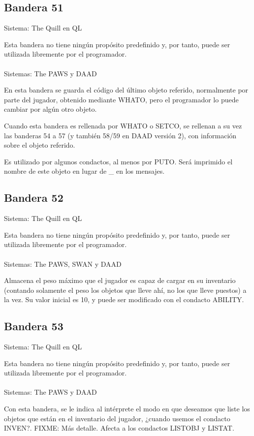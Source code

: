 \documentclass[11pt, a5paper]{article}
\newcommand{\quill}{\textsf{The Quill}\xspace}
\newcommand{\paw}{\textsf{The PAWS}\xspace}
\newcommand{\swan}{\textsf{SWAN}\xspace}
\newcommand{\daad}{\textsf{DAAD}\xspace}
\newcommand{\sistema}[1]{\noindent Sistema: #1 \nopagebreak}
\newcommand{\sistemas}[1]{\noindent Sistemas: #1 \nopagebreak}
\begin{document}
\subsection{Bandera 51}

\sistema{\quill en QL}

Esta bandera no tiene ningún propósito predefinido y, por tanto, puede ser utilizada libremente por el programador.
\\\ \\
\sistemas{\paw y \daad}

En esta bandera se guarda el código del último objeto referido, normalmente por parte del jugador, obtenido mediante WHATO, pero el programador lo puede cambiar por algún otro objeto.

Cuando esta bandera es rellenada por WHATO o SETCO, se rellenan a su vez las banderas 54 a 57 (y también 58/59 en \daad versión 2), con información sobre el objeto referido.

Es utilizado por algunos condactos, al menos por PUTO. Será imprimido el nombre de este objeto en lugar de \_ en los mensajes.

\subsection{Bandera 52}

\sistema{\quill en QL}

Esta bandera no tiene ningún propósito predefinido y, por tanto, puede ser utilizada libremente por el programador.
\\\ \\
\sistemas{\paw, \swan y \daad}

Almacena el peso máximo que el jugador es capaz de cargar en su inventario (contando solamente el peso los objetos que lleve ahí, no los que lleve puestos) a la vez. Su valor inicial es 10, y puede ser modificado con el condacto ABILITY.

\subsection{Bandera 53}

\sistema{\quill en QL}

Esta bandera no tiene ningún propósito predefinido y, por tanto, puede ser utilizada libremente por el programador.
\\\ \\
\sistemas{\paw y \daad}

Con esta bandera, se le indica al intérprete el modo en que deseamos que liste los objetos que están en el inventario del jugador, ¿cuando usemos el condacto INVEN?. FIXME: Más detalle. Afecta a los condactos LISTOBJ y LISTAT.
\end{document}
